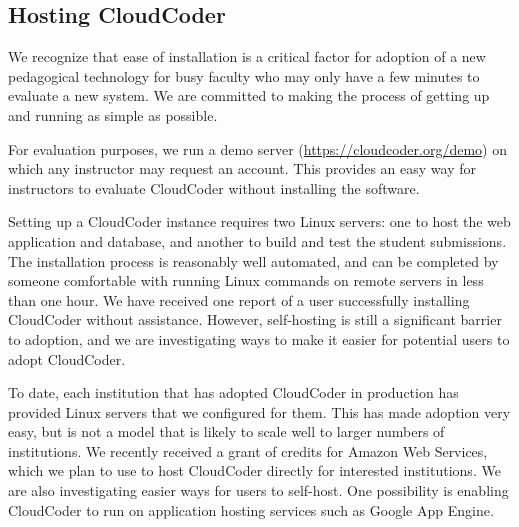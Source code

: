 \documentclass{sig-alternate}
\begin{document}




\subsection{Hosting CloudCoder}

We recognize that ease of installation is a critical factor for
adoption of a new pedagogical technology for busy
faculty who may only have a few minutes to evaluate a new system.  We
are committed to making the process
of getting up and running as simple as possible.

For evaluation purposes, we run a demo server
(\url{https://cloudcoder.org/demo}) on which any instructor may request
an account.  This provides an easy way for instructors to evaluate
CloudCoder without installing the software.

Setting up a CloudCoder instance requires two Linux servers: one to
host the web application and database, and another to build and
test the student submissions.  The installation process is reasonably well
automated, and can be completed by someone comfortable with
running Linux commands on remote servers in less than one hour.
We have received one report of a user successfully installing CloudCoder
without assistance.  However, self-hosting is still a significant
barrier to adoption, and we are investigating ways to make it
easier for potential users to adopt CloudCoder.

To date, each institution that has adopted CloudCoder in production has
provided Linux servers that we configured for them.  This has made
adoption very easy, but is not a model that is likely to scale well
to larger numbers of institutions.  We recently received a grant
of credits for Amazon Web Services\cite{aws},
which we plan to use to host CloudCoder directly for interested
institutions.  We are also investigating easier ways for
users to self-host. One possibility is enabling CloudCoder to run on application
hosting services such as Google App Engine\cite{gae}.
\end{document}
